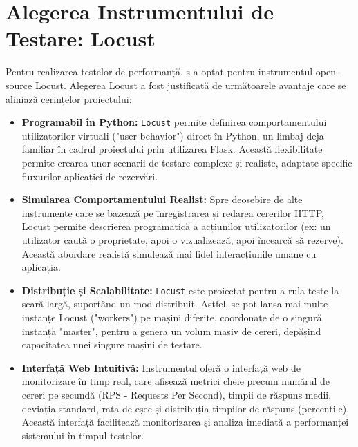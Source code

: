 \documentclass[12pt, a4paper, oneside, romanian]{teza-upb}
\begin{document}
\section{Alegerea Instrumentului de Testare: Locust}
Pentru realizarea testelor de performanță, s-a optat pentru instrumentul open-source Locust. Alegerea Locust a fost justificată de următoarele avantaje care se aliniază cerințelor proiectului:


\begin{itemize}
	\item \textbf{Programabil în Python:} \texttt{Locust} permite definirea comportamentului utilizatorilor virtuali ("user behavior") direct în Python, un limbaj deja familiar în cadrul proiectului prin utilizarea Flask. Această flexibilitate permite crearea unor scenarii de testare complexe și realiste, adaptate specific fluxurilor aplicației de rezervări.
	\item \textbf{Simularea Comportamentului Realist:} Spre deosebire de alte instrumente care se bazează pe înregistrarea și redarea cererilor HTTP, Locust permite descrierea programatică a acțiunilor utilizatorilor (ex: un utilizator caută o proprietate, apoi o vizualizează, apoi încearcă să rezerve). Această abordare realistă simulează mai fidel interacțiunile umane cu aplicația.
	\item \textbf{Distribuție și Scalabilitate:} \texttt{Locust} este proiectat pentru a rula teste la scară largă, suportând un mod distribuit. Astfel, se pot lansa mai multe instanțe Locust ("workers") pe mașini diferite, coordonate de o singură instanță "master", pentru a genera un volum masiv de cereri, depășind capacitatea unei singure mașini de testare.
	
	\item \textbf{Interfață Web Intuitivă:} Instrumentul oferă o interfață web de monitorizare în timp real, care afișează metrici cheie precum numărul de cereri pe secundă (RPS - Requests Per Second), timpii de răspuns medii, deviația standard, rata de eșec și distribuția timpilor de răspuns (percentile). Această interfață facilitează monitorizarea și analiza imediată a performanței sistemului în timpul testelor.
\end{itemize}
\end{document}
